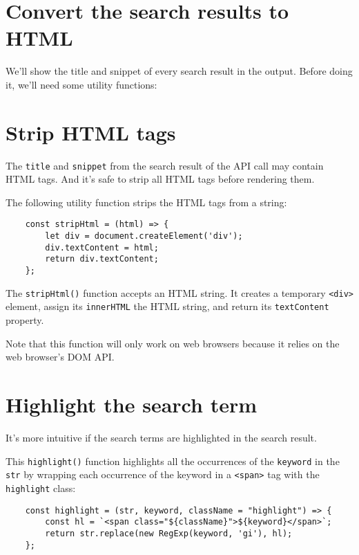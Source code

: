 \documentclass[11pt]{article}
\begin{document}
\section*{Convert the search results to HTML}

We'll show the title and snippet of every search result in the output.
Before doing it, we'll need some utility functions:

\section*{Strip HTML tags}

The \verb|title| and \verb|snippet| from the search result of the API call may
contain HTML tags. And it's safe to strip all HTML tags
before rendering them.
\newline

\noindent
The following utility function strips the HTML tags from a string:

\begin{lstlisting}
    const stripHtml = (html) => {
        let div = document.createElement('div');
        div.textContent = html;
        return div.textContent;
    };
\end{lstlisting}

The \verb|stripHtml()| function accepts an HTML string. It creates a
temporary \verb|<div>| element, assign its \verb|innerHTML| the HTML string,
and return its \verb|textContent| property.

\begin{displayquote}
Note that this function will only work on web browsers because it
relies on the web browser's DOM API.
\end{displayquote}

\section*{Highlight the search term}

It's more intuitive if the search terms are highlighted in the search result.
\newline

\noindent
This \verb|highlight()| function highlights all the occurrences of the
\verb|keyword| in the \verb|str| by wrapping each occurrence of the keyword in
a \verb|<span>| tag with the \verb|highlight| class:

\begin{lstlisting}
    const highlight = (str, keyword, className = "highlight") => {
        const hl = `<span class="${className}">${keyword}</span>`;
        return str.replace(new RegExp(keyword, 'gi'), hl);
    };
\end{lstlisting}
\end{document}
